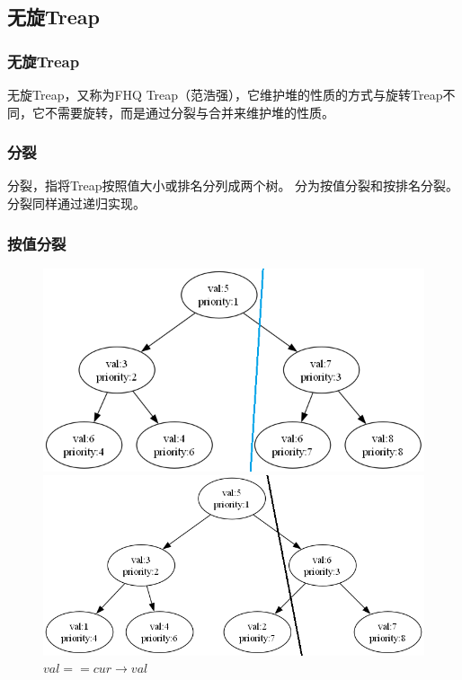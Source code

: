 \documentclass[utf8]{ctexbeamer}
\begin{document}
    \subsection{无旋Treap}

    \begin{frame}
        \frametitle{无旋Treap}
        无旋Treap，又称为FHQ Treap（范浩强），它维护堆的性质的方式与旋转Treap不同，它不需要旋转，而是通过分裂与合并来维护堆的性质。
    \end{frame}

    \begin{frame}
        \frametitle{分裂}
        分裂，指将Treap按照值大小或排名分列成两个树。
        分为按值分裂和按排名分裂。
        分裂同样通过递归实现。
    \end{frame}

    \begin{frame}[fragile]
        \frametitle{按值分裂}
        \begin{figure}
            \begin{minipage}[t]{0.4\textwidth}
                \includegraphics[height=0.8\linewidth]{images/Treap_split0.png}
                \caption{$val==cur\rightarrow val$}
            \end{minipage}
            \vfill
            \begin{minipage}[b]{0.4\textwidth}
                \includegraphics[width=\linewidth]{images/Treap_split1.png}

\end{minipage}
\end{figure}
\end{frame}
\end{document}
